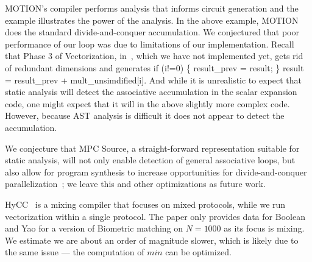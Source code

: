 MOTION's compiler performs analysis that informs circuit generation and the example illustrates the power of the analysis. In the above example, 
MOTION does the standard divide-and-conquer accumulation. We conjectured that poor performance of our loop was due to
limitations of our implementation. Recall that Phase 3 of Vectorization, in~, which we have not implemented yet, gets rid of redundant 
dimensions and generates {\sf if (i!=0) \{ result\_prev = result; \} result = result\_prev + mult\_unsimdified[i]}. And while it is unrealistic to expect that static analysis 
will detect the associative accumulation in the scalar expansion code, one might expect that it will in the above slightly more complex code. 
However, because AST analysis is difficult it does not appear to detect the accumulation.

We conjecture that MPC Source, a straight-forward representation suitable for static analysis, will not only enable detection of general associative loops, but also allow 
for program synthesis to increase opportunities for divide-and-conquer parallelization~\cite{Farzan:2021}; we leave this and other optimizations as future work. 

HyCC~\cite{CCS:BDKKS18} is a mixing compiler that focuses on mixed protocols, while we run vectorization within a single protocol. 
The paper only provides data for Boolean and Yao for a version of Biometric matching on $N=1000$ as its focus is mixing. %
We estimate we are about an order of magnitude slower, which is likely due to the same issue --- the computation of $\mathit{min}$ can be optimized. 




